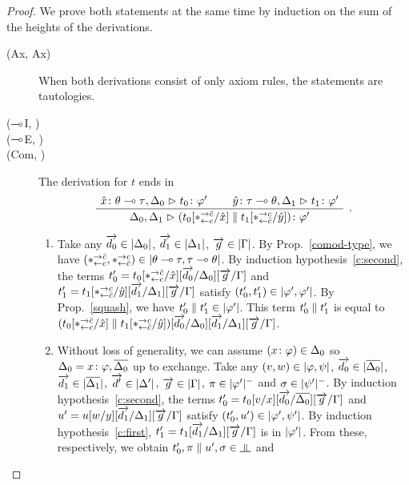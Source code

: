  \begin{proof}
 We prove both statements at the same time by induction on the sum of
 the heights of the derivations.
  \begin{description}
  \item[(Ax, Ax)] When both derivations consist of only axiom rules,
       the statements are tautologies.
   \item[($\multimap$I, \textminus)]
  \item[($\multimap$E, \textminus)]
   \item[(Com, \textminus)]
       The derivation for $t$ ends in
       \[
       \aseq{\tj{\hat x}{\theta\limp\tau},\D_0}{\tj{t_0}{\phi'}}
       \aseq{\tj{\hat y}{\tau\limp\theta},\D_1}{\tj{t_1}{\phi'}}
       \bseq{\D_0,\D_1}{\tj{(t_0[\comodL/\hat x]\conc t_1[\comodR/\hat
       y])}{\phi'}}
       \DisplayProof\enspace.
       \]
       \begin{enumerate}[label=\textit{(\arabic{*})}]
	\item Take any
	      $\overrightarrow{d_0}\in|{\Delta_0}|$,
	      $\overrightarrow{d_1}\in|{\Delta_1}|$,
	      $\overrightarrow{g}  \in|{\Gamma}|$.
	      By Prop.~\ref{comod-type}, we have
	      $(\ast^{\rightarrow {\bar{c}}}_{\leftarrow{c}},\ast^{\rightarrow {c}}_{\leftarrow{\bar{c}}})\in|{\theta\multimap\tau,\tau\multimap\theta}|$.
	      By induction hypothesis~\ref{c:second}, the terms
	      $t_0'=t_0[\ast^{\rightarrow {\bar{c}}}_{\leftarrow{c}}/\hat x][\overrightarrow{d_0}/\Delta_0][\overrightarrow g/\Gamma]$
	      and
	      $t_1'=t_1[\ast^{\rightarrow {c}}_{\leftarrow{\bar{c}}}/\hat y][\overrightarrow{d_1}/\Delta_1][\overrightarrow g/\Gamma]$
	      satisfy
	      $(t_0',t_1')\in|{\varphi',\varphi'}|$.
	      By Prop.~\ref{squash}, we have $t_0'\parallel
	      t_1'\in|{\varphi'}|$.
	      This term $t_0'\parallel t_1'$ is equal to
	      $(t_0[\ast^{\rightarrow {\bar{c}}}_{\leftarrow{c}}/\hat x]\parallel t_1[\ast^{\rightarrow {c}}_{\leftarrow{\bar{c}}}/\hat
	      y])[\overrightarrow{d_0}/\Delta_0][\overrightarrow{d_1}/\Delta_1][\overrightarrow g/\Gamma]$.
	\item Without loss of generality,
	      we can assume $({x} \colon{\varphi})\in\Delta_0$ so
	      $\Delta_0 ={x} \colon{\varphi}, \overline{\Delta_0}$ up to exchange.
	      Take any
	      $(v,w)\in|{\varphi,\psi}|$,
	      $\overrightarrow{d_0}\in|{\overline{\Delta_0}}|$,
	      $\overrightarrow{d_1}\in|{\overline{\Delta_1}}|$,
	      $\overrightarrow{d'}\in|{\Delta'}|$,
	      $\overrightarrow g\in |{\Gamma}|$,
	      $\pi\in|{\varphi'}|^-$ and
	      $\sigma\in|{\psi'}|^-$.
	      By induction hypothesis~\ref{c:second},
	      the terms $t_0'=t_0[v/x][\overrightarrow{d_0}/\overline{\Delta_0}][\overrightarrow
	      g/\Gamma]$
	      and
	      $u'=u[w/y][\overrightarrow{d_1}/\Delta_1][\overrightarrow g/\Gamma]$
	      satisfy
	      $(t_0',u')\in|{\varphi',\psi'}|$.
	      By induction hypothesis~\ref{c:first},
	      $t_1'=t_1[\overrightarrow{d_1}/\Delta_1][\overrightarrow g/\Gamma]$ is in $|{\varphi'}|$.
	      From these, respectively, we obtain
	      $t_0',\pi\conc u',\sigma\in\bbot$
	      and

\end{enumerate}
\end{description}
\end{proof}
